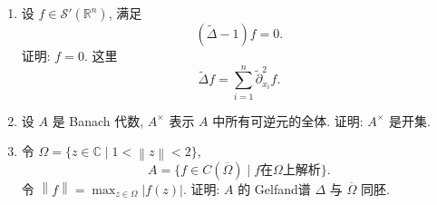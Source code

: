 \documentclass{ctexart}
\newcommand{\norm}[1]{\left\lVert#1\right\rVert}
\newcommand{\abs}[1]{\left\lvert#1\right\rvert}
\begin{document}
\begin{enumerate}
\item 设 $f \in \mathcal{S}'(\mathbb{R}^n)$, 满足
\[
(\tilde{\Delta} - 1)f = 0.
\]
证明: $f = 0$. 这里
\[
\tilde{\Delta}f = \sum_{i=1}^n{\tilde{\partial}_{x_i}^2f}.
\]

\item 设 $A$ 是 Banach 代数, $A^\times$ 表示 $A$ 中所有可逆元的全体.
  证明: $A^\times$ 是开集.

\item 令 $\Omega = \{z \in \mathbb{C} \mid 1 < \norm{z} < 2\}$,
\[
A = \{f \in C(\overline{\Omega}) \mid f \text{在}\Omega\text{上解析}\}.
\]
令 $\norm{f} = \max_{z \in \Omega}{\abs{f(z)}}$. 证明: $A$ 的 Gelfand谱 $\Delta$ 与 $\overline{\Omega}$ 同胚.
\end{enumerate}
\end{document}

